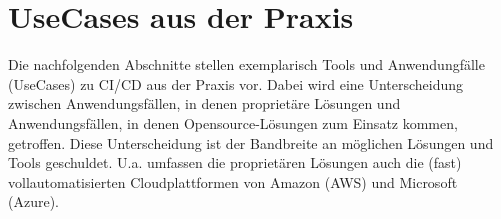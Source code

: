 \section{UseCases aus der Praxis}
\label{UseCases aus der Praxis}
Die nachfolgenden Abschnitte stellen exemplarisch Tools und Anwendungfälle (UseCases) zu \acrshort{CI}/\acrshort{CD} aus der Praxis vor. Dabei wird eine Unterscheidung zwischen Anwendungsfällen, in denen proprietäre Lösungen und Anwendungsfällen, in denen Opensource-Lösungen zum Einsatz kommen, getroffen. Diese Unterscheidung ist der Bandbreite an möglichen Lösungen und Tools geschuldet. U.a. umfassen die proprietären Lösungen auch die (fast) vollautomatisierten Cloudplattformen von Amazon (\acrshort{AWS}) und Microsoft (Azure).